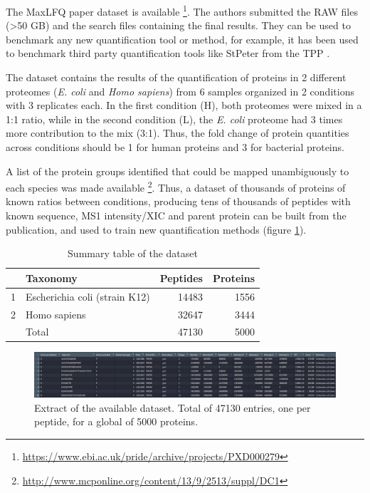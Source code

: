 \documentclass[11pt, a4paper]{report}
\begin{document}
The MaxLFQ paper dataset is available \footnote{\href{https://www.ebi.ac.uk/pride/archive/projects/PXD000279}{https://www.ebi.ac.uk/pride/archive/projects/PXD000279}}. The authors submitted the RAW files (>50 GB) and the search files containing the final results. They can be used to benchmark any new quantification tool or method, for example, it has been used to benchmark third party quantification tools like StPeter from the TPP \cite{Hoopmann2018}.

The dataset contains the results of the quantification of proteins in 2 different proteomes (\textit{E. coli} and \textit{Homo sapiens}) from 6 samples organized in 2 conditions with 3 replicates each. In the first condition (H), both proteomes were mixed in a 1:1 ratio, while in the second condition (L), the \textit{E. coli} proteome had 3 times more contribution to the mix (3:1). Thus, the fold change of protein quantities across conditions should be 1 for human proteins and 3 for bacterial proteins.

A list of the protein groups identified that could be mapped unambiguously to each species was made available \footnote{\href{http://www.mcponline.org/content/13/9/2513/suppl/DC1}{http://www.mcponline.org/content/13/9/2513/suppl/DC1}}. Thus, a dataset of thousands of proteins of known ratios between conditions, producing tens of thousands of peptides with known sequence, \ac{MS1} intensity/XIC and parent protein can be built from the publication, and used to train new quantification methods (figure \ref{fig:screenshot_peptide_data}).

\begin{table}[ht]
\centering
\begin{tabular}{rlrr}
  \hline
 & Taxonomy & Peptides & Proteins \\ 
  \hline
1 & Escherichia coli (strain K12) & 14483 & 1556 \\ 
  2 & Homo sapiens & 32647 & 3444 \\ 
   \hline
   & Total & 47130 & 5000
\end{tabular}
\caption{Summary table of the dataset}
\label{table:summary_peptide_data}
\end{table}

\begin{figure}[!h]
\includegraphics[width=1\textwidth]{dataset}
\caption{Extract of the available dataset. Total of 47130 entries, one per peptide, for a global of 5000 proteins.}
\label{fig:screenshot_peptide_data}
\end{figure}
\end{document}
